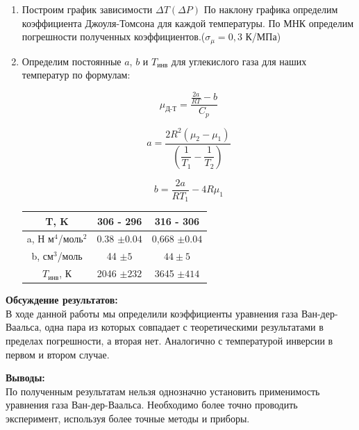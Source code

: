 \documentclass[a4paper, 12pt]{article}%
\begin{document}
\begin{enumerate}
\newpage

	\item Построим график зависимости $\Delta T (\Delta P)$ По наклону графика определим коэффициента Джоуля-Томсона для каждой температуры. По МНК определим погрешности полученных коэффициентов.($\sigma_{\mu} = 0,3$ К/МПа)
	
		\begin{figure}[h!]
	\end{figure}
	
	
	\item Определим постоянные $a$, $b$ и $T_{\text{инв}}$ для углекислого газа для наших температур по формулам: 
	
	$$\mu_{\text{Д-Т}} =  \dfrac{\frac{2a}{RT}-b}{C_p}$$ 
	
	$$a = \dfrac{2R^2(\mu_2 - \mu_1)}{ \left( \dfrac{1}{T_1} - \dfrac{1}{T_2} \right)}  $$
	
	$$ b = \dfrac{2a}{RT_1} - 4R \mu_1  $$
	
	\begin{longtable}{|c|c|c|}
		\hline
		T, K & 306 - 296 & 316 - 306\\
		\hline
		a, Н м$^4$/моль$^2$ & 0.38 $\pm 0.04$& 0,668 $\pm 0.04$\\
		\hline
		b, см$^3$/моль & 44 $\pm 5$& $ 44\pm 5$\\
		\hline
		$T_{\text{инв}}$, К& 2046 $\pm 232$& 3645 $\pm 414$\\
		\hline
	\end{longtable}


	\end{enumerate}

	\textbf{Обсуждение результатов: }\\
	В ходе данной работы мы определили коэффициенты уравнения газа  Ван-дер-Ваальса, одна пара из которых совпадает с теоретическими результатами в пределах погрешности, а вторая нет. Аналогично с температурой инверсии в первом и втором случае.  


\textbf{Выводы: }\\
По полученным результатам нельзя однозначно установить применимость уравнения газа  Ван-дер-Ваальса. Необходимо более точно проводить эксперимент, используя более точные методы и приборы.


	
\end{document}
